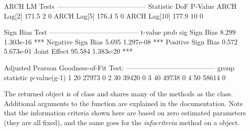 \begin{Schunk}
\begin{Soutput}
ARCH LM Tests
---------------------------------------
             Statistic DoF P-Value
ARCH Lag[2]      171.5   2       0
ARCH Lag[5]      176.4   5       0
ARCH Lag[10]     177.9  10       0


Sign Bias Test
---------------------------------------
                   t-value      prob sig
Sign Bias            8.299 1.303e-16 ***
Negative Sign Bias   5.695 1.297e-08 ***
Positive Sign Bias   0.572 5.673e-01
Joint Effect        95.584 1.383e-20 ***


Adjusted Pearson Goodness-of-Fit Test:
---------------------------------------
  group statistic p-value(g-1)
1    20     27973            0
2    30     39420            0
3    40     49738            0
4    50     58614            0
\end{Soutput}
\end{Schunk}
The returned object is of class \verb@uGARCHfilter@ and shares many of the methods
as the \verb@uGARCHfit@ class. Additional arguments to the function are explained
in the documentation. Note that the information criteria shown here are based on
zero estimated parameters (they are all fixed), and the same goes for the
\emph{infocriteria} method on a \verb@uGARCHfilter@ object.

